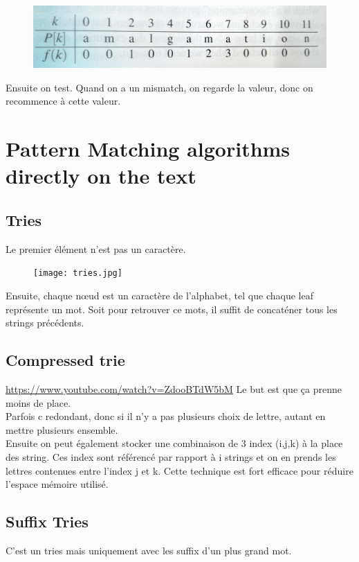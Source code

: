 \documentclass[a4paper]{article}
\begin{document}
\begin{figure}[!h]
\begin{center}
\includegraphics[scale=0.07]{KMP.jpg}
\end{center}
\end{figure}
Ensuite on test. Quand on a un mismatch, on regarde la valeur, donc on recommence à cette valeur.

\section{Pattern Matching algorithms directly on the text}

\subsection{Tries}
Le premier élément n'est pas un caractère.
\begin{figure}[!h]
\begin{center}
\texttt{[image: tries.jpg]}
\end{center}
\end{figure}
Ensuite, chaque nœud est un caractère de l'alphabet, tel que chaque leaf représente un mot. Soit pour retrouver ce mots, il suffit de concaténer tous les strings précédents.


\subsection{Compressed trie}
\url{https://www.youtube.com/watch?v=ZdooBTdW5bM}
Le but est que ça prenne moins de place.\\
Parfois c redondant, donc si il n'y a pas plusieurs choix de lettre, autant en mettre plusieurs ensemble.\\
Ensuite on peut également stocker une combinaison de 3 index (i,j,k) à la place des string. Ces index sont référencé par rapport à i strings et on en prends les lettres contenues entre l'index j et k.
Cette technique est fort efficace pour réduire l'espace mémoire utilisé.

\subsection{Suffix Tries}
C'est un tries mais uniquement avec les suffix d'un plus grand mot.
\end{document}
